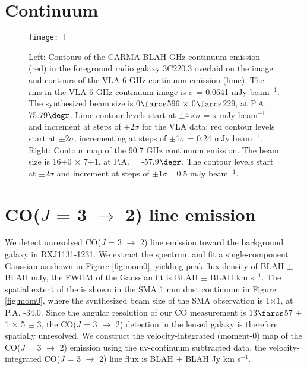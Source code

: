 \documentclass[]{emulateapj}
\begin{document}
\author{Draft}


\section{Continuum}


\begin{figure*}[tbph]
\centering
\texttt{[image: ]}
\caption{Left: Contours of the CARMA BLAH GHz continuum emission (red) in the foreground radio galaxy 3C220.3 overlaid on the image and contours of the VLA 6 GHz continuum emission (lime). The rms in the VLA 6 GHz continuum image is $\sigma$ = 0.0641 mJy beam$^{-1}$. The synthesized beam size is 0$\farcs$596 $\times$ 0$\farcs$229, at P.A. 75.79$\degr$. Lime contour levels start at $\pm$4$\times\sigma$ = x mJy beam$^{-1}$ and increment at steps of $\pm$2$\sigma$ for the VLA data; red contour levels start at $\pm$2$\sigma$, incrementing at steps of $\pm$1$\sigma$ = 0.24 mJy beam$^{-1}$.
Right:
Contour map of the 90.7 GHz continuum emission. The beam size is 16$\pm
$0 $\times$ 7$\pm$1, at P.A. = -57.9$\degr$. The contour levels start at $\pm$2$\sigma$ and increment at steps of $\pm$1$\sigma$ =0.5 mJy beam$^{-1}$.\label{fig:cont}}
\end{figure*}


\section{CO($J$ = 3 $\rightarrow$ 2) line emission}

We detect unresolved CO($J$ = 3 $\rightarrow$ 2) line emission toward the background galaxy in RXJ1131-1231. 
We extract the spectrum and fit a single-component Gaussian as shown in Figure \ref{fig:mom0}, yielding peak flux density of BLAH $\pm$ BLAH mJy, the FWHM of the Gaussian fit is BLAH $\pm$ BLAH km s$^{-1}$. 
The spatial extent of the  is shown in the SMA 1 mm dust continuum in Figure \ref{fig:mom0}, where the synthesized beam size of the SMA observation is 1$\times$1, at P.A. -34.0\degr. Since the angular resolution of our CO measurement is 13$\farcs$57 $\pm$ 1 $\times$ 5 $\pm$ 3, the CO($J$ = 3 $\rightarrow$ 2) detection in the lensed galaxy is therefore spatially unresolved. 
We construct the velocity-integrated (moment-0) map of the CO($J$ = 3 $\rightarrow$ 2) emission using the uv-continuum subtracted data, the velocity-integrated CO($J$ = 3 $\rightarrow$ 2) line flux is BLAH $\pm$ BLAH Jy km s$^{-1}$.
\end{document}
